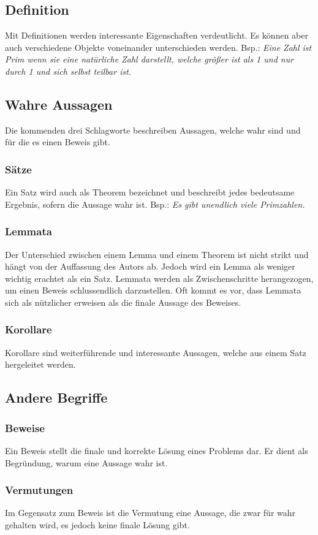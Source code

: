 \documentclass[12pt,a4paper]{article}
\theoremstyle{definition}
\begin{document}
\subsection*{Definition}
Mit Definitionen werden interessante Eigenschaften verdeutlicht.
Es können aber auch verschiedene Objekte voneinander unterschieden werden.\newline
Bsp.: \textit{Eine Zahl ist Prim wenn sie eine natürliche Zahl darstellt, welche größer ist als 1 und nur durch 1 und sich selbst teilbar ist.}
\subsection*{Wahre Aussagen}
Die kommenden drei Schlagworte beschreiben Aussagen, welche wahr sind und für die es einen Beweis gibt.
\subsubsection*{Sätze}
Ein Satz wird auch als Theorem bezeichnet und beschreibt jedes bedeutsame Ergebnis, sofern die Aussage wahr ist.\newline
Bsp.: \textit{Es gibt unendlich viele Primzahlen.}
\subsubsection*{Lemmata}
Der Unterschied zwischen einem Lemma und einem Theorem ist nicht strikt und hängt von der Auffassung des Autors ab.
Jedoch wird ein Lemma als weniger wichtig erachtet als ein Satz.
Lemmata werden als Zwischenschritte herangezogen, um einen Beweis schlussendlich darzustellen.
Oft kommt es vor, dass Lemmata sich als nützlicher erweisen als die finale Aussage des Beweises.
\subsubsection*{Korollare}
Korollare sind weiterführende und interessante Aussagen, welche aus einem Satz hergeleitet werden.

\subsection*{Andere Begriffe}
\subsubsection*{Beweise}
Ein Beweis stellt die finale und korrekte Lösung eines Problems dar.
Er dient als Begründung, warum eine Aussage wahr ist.
\subsubsection*{Vermutungen}
Im Gegensatz zum Beweis ist die Vermutung eine Aussage, die zwar für wahr gehalten wird, es jedoch keine finale Lösung gibt.
\end{document}

